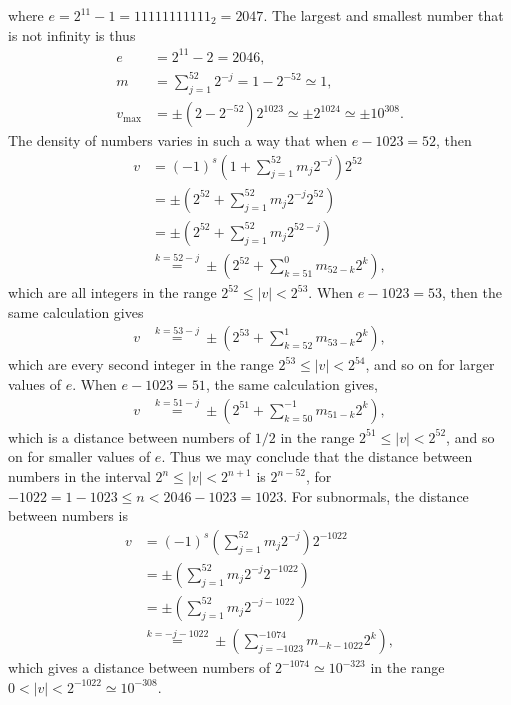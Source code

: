\documentclass[fsharpNotes.tex]{subfiles}
\begin{document}
where $e=2^{11}-1=11111111111_2=2047$. The largest and smallest number that is not infinity is thus
\begin{align}
  e &= 2^{11}-2 = 2046,\\
  m &= \sum _{j=1}^{52}2^{-j} = 1 - 2^{-52} \simeq 1,\\
  v_\text{max} &= \pm \left(2-2^{-52}\right) 2^{1023} \simeq \pm 2^{1024} \simeq \pm 10^{308}.
\end{align}
The density of numbers varies in such a way that when $e-1023 = 52$, then
\begin{align}
  v &= \left(-1\right)^{s} \left(1+\sum _{j=1}^{52}m_j2^{-j}\right) 2^{52} 
  \\&= \pm \left(2^{52}+\sum _{j=1}^{52}m_j2^{-j}2^{52}\right) 
  \\&= \pm \left(2^{52}+\sum _{j=1}^{52}m_j2^{52-j}\right) 
  \\&\overset{k=52-j}{=} \pm \left(2^{52}+\sum _{k=51}^{0}m_{52-k}2^k\right),
\end{align}
which are all integers in the range $2^{52}\leq |v| < 2^{53}$. When $e-1023 = 53$, then the same calculation gives
\begin{align}
  v &\overset{k=53-j}{=} \pm \left(2^{53}+\sum _{k=52}^{1}m_{53-k}2^k\right),
\end{align}
which are every second integer in the range $2^{53}\leq |v| < 2^{54}$, and so on for larger values of $e$. When $e-1023 = 51$, the same calculation gives,
\begin{align}
  v &\overset{k=51-j}{=} \pm \left(2^{51}+\sum _{k=50}^{-1}m_{51-k}2^k\right),
\end{align}
which is a distance between numbers of $1/2$ in the range $2^{51}\leq |v| < 2^{52}$, and so on for smaller values of $e$. Thus we may conclude that the distance between numbers in the interval $2^n\leq |v| < 2^{n+1}$ is $2^{n-52}$, for $-1022 = 1-1023\leq n<2046-1023=1023$.  For subnormals, the distance between numbers is
\begin{align}
  v &= \left(-1\right)^{s} \left(\sum _{j=1}^{52}m_j2^{-j}\right) 2^{-1022} 
  \\&= \pm \left(\sum _{j=1}^{52}m_j2^{-j}2^{-1022}\right) 
  \\&= \pm \left(\sum _{j=1}^{52}m_j2^{-j -1022}\right) 
  \\&\overset{k=-j-1022}{=} \pm \left(\sum _{j=-1023}^{-1074}m_{-k-1022}2^k\right),
\end{align}
which gives a distance between numbers of $2^{-1074} \simeq 10^{-323}$ in the range $0<|v|<2^{-1022}\simeq10^{-308}$.
\end{document}
